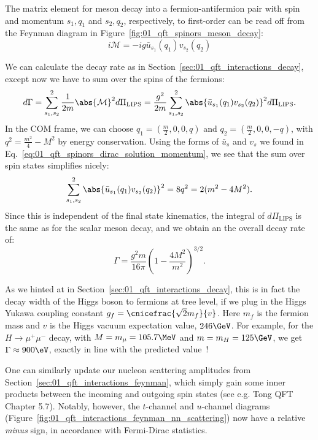 The matrix element for meson decay into a fermion-antifermion pair with spin and momentum $s_1, q_1$ and $s_2, q_2$, respectively, to first-order can be read off from the Feynman diagram in Figure~\ref{fig:01_qft_spinors_meson_decay}:
\begin{equation}
	\label{eq:01_qft_spinors_meson_decay_m}
	i \mathcal M = -ig\bar u_{s_1}(q_1) v_{s_2}(q_2)
\end{equation}

We can calculate the decay rate as in Section~\ref{sec:01_qft_interactions_decay}, except now we have to sum over the spins of the fermions:
\begin{equation}
	\label{eq:01_qft_spinors_meson_decay_rate}
	d\Gamma = \sum_{s_1, s_2}^2 \frac{1}{2m} \abs{\mathcal M}^2 d\Pi_{\mathrm{LIPS}} = \frac{g^2}{2m} \sum_{s_1, s_2}^2 \abs{\bar u_{s_1}(q_1) v_{s_2}(q_2)}^2 d\Pi_{\mathrm{LIPS}}.
\end{equation}
In the COM frame, we can choose $q_1 = (\frac{m}{2}, 0, 0, q)$ and $q_2 = (\frac{m}{2}, 0, 0, -q)$, with $q^2 = \frac{m^2}{4} - M^2$ by energy conservation.
Using the forms of $\bar u_s$ and $v_s$ we found in Eq.~\ref{eq:01_qft_spinors_dirac_solution_momentum}, we see that the sum over spin states simplifies nicely:
\begin{equation}
	\label{eq:01_qft_spinors_meson_decay_sum}
	\sum_{s_1, s_2}^2 \abs{\bar u_{s_1}(q_1) v_{s_2}(q_2)}^2 = 8q^2 = 2(m^2 - 4M^2).
\end{equation}
Since this is independent of the final state kinematics, the integral of $d\Pi_{\mathrm{LIPS}}$ is the same as for the scalar meson decay, and we obtain an the overall decay rate of:
\begin{equation}
	\label{eq:01_qft_spinors_meson_decay_rate_final}
	\Gamma = \frac{g^2m}{16\pi} \left(1 - \frac{4M^2}{m^2}\right)^{3/2}.
\end{equation}

As we hinted at in Section~\ref{sec:01_qft_interactions_decay}, this is in fact the decay width of the Higgs boson to fermions at tree level, if we plug in the Higgs Yukawa coupling constant $g_f = \cnicefrac{\sqrt{2} m_f}{v}$.
Here $m_f$ is the fermion mass and $v$ is the Higgs vacuum expectation value, $246\GeV$.
For example, for the $H\to \mu^+\mu^-$ decay, with $M = m_\mu = 105.7\MeV$ and $m = m_H = 125\GeV$, we get $\Gamma \approx 900\eV$, exactly in line with the predicted value~\cite{Denner:2011mq}!

One can similarly update our nucleon scattering amplitudes from Section~\ref{sec:01_qft_interactions_feynman}, which simply gain some inner products between the incoming and outgoing spin states (see e.g. Tong QFT~\cite{TongQFT} Chapter 5.7).
Notably, however, the $t$-channel and $u$-channel diagrams (Figure~\ref{fig:01_qft_interactions_feynman_nn_scattering}) now have a relative \textit{minus} sign, in accordance with Fermi-Dirac statistics.


